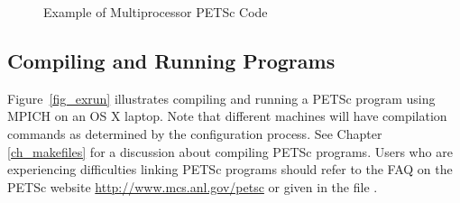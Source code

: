 \begin{figure}[H]
{
  
}
\nobreak
  \caption{Example of Multiprocessor PETSc Code}
\label{fig_example2}
\end{figure}

\subsection*{Compiling and Running Programs}

Figure~\ref{fig_exrun} illustrates compiling and running a PETSc program
using MPICH on an OS X laptop.  Note that different machines will have
compilation commands as determined by the configuration process.  See Chapter \ref{ch_makefiles}
for a discussion about compiling PETSc programs.
Users who are experiencing difficulties linking PETSc programs should
refer to the FAQ on the PETSc website
\href{http://www.mcs.anl.gov/petsc}{http://www.mcs.anl.gov/petsc} or
given in the file .

